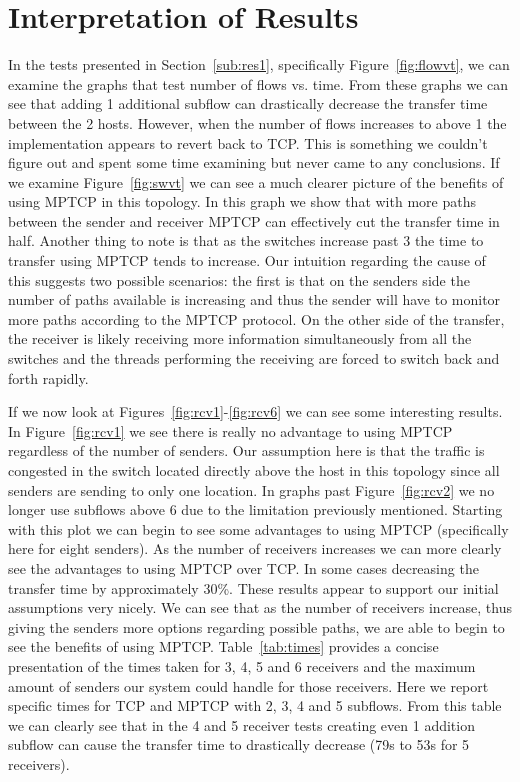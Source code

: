 \documentclass[10pt]{report}
\begin{document}
\section{Interpretation of Results}
In the tests presented in Section~\ref{sub:res1}, specifically
Figure~\ref{fig:flowvt}, we can examine the
graphs that test number of flows vs. time. From these graphs we can
see that adding 1 additional subflow can drastically decrease the
transfer time between the 2 hosts. However, when the number of flows
increases to above 1 the implementation appears to revert back to
TCP. This is something we couldn't figure out and spent some time
examining but never came to any conclusions. If we examine
Figure~\ref{fig:swvt} we can see a much clearer picture of the
benefits of using MPTCP in this topology. In this graph we show that
with more paths between the sender and receiver MPTCP can effectively
cut the transfer time in half. Another thing to note is that as the
switches increase past 3 the time to transfer using MPTCP tends to
increase. Our intuition regarding the cause of this suggests two
possible scenarios: the first is that on the senders side the number
of paths available is increasing and thus the sender will have to
monitor more paths according to the MPTCP protocol. On the other side
of the transfer, the receiver is likely receiving more information
simultaneously from all the switches and the threads performing the
receiving are forced to switch back and forth rapidly. 

If we now look at Figures~\ref{fig:rcv1}-\ref{fig:rcv6} we can see
some interesting results. In Figure~\ref{fig:rcv1} we see there is
really no advantage to using MPTCP regardless of the number of
senders. Our assumption here is that the traffic is congested in the
switch located directly above the host in this topology since all
senders are sending to only one location. In graphs past
Figure~\ref{fig:rcv2} we no longer use subflows above 6 due to the
limitation previously mentioned. Starting with this plot we can begin
to see some advantages to using MPTCP (specifically here for eight
senders). As the number of receivers increases we can more clearly see
the advantages to using MPTCP over TCP. In some cases decreasing the
transfer time by approximately 30\%. These results appear to support
our initial assumptions very nicely. We can see that as the number of
receivers increase, thus giving the senders more options regarding
possible paths, we are able to begin to see the benefits of using
MPTCP. Table~\ref{tab:times} provides a concise presentation of the
times taken for 3, 4, 5 and 6 receivers and the maximum amount of
senders our system could handle for those receivers. Here we report
specific times for TCP and MPTCP with 2, 3, 4 and 5 subflows. From
this table we can clearly see that in the 4 and 5 receiver tests
creating even 1 addition subflow can cause the transfer time to
drastically decrease (79s to 53s for 5 receivers).
\end{document}
